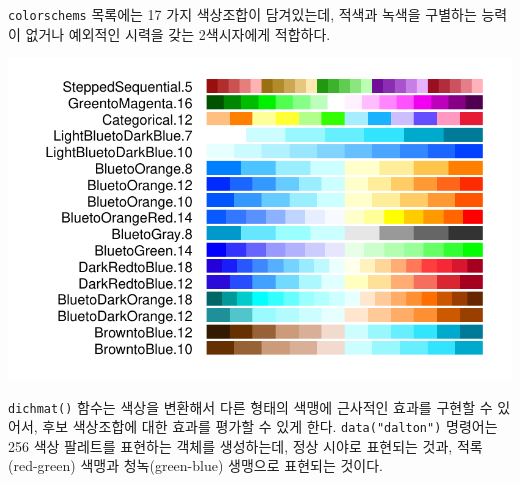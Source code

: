 \documentclass[
  letterpaper,
]{book}
\newenvironment{Shaded}{\begin{snugshade}}{\end{snugshade}}
\newcommand{\AttributeTok}[1]{\textcolor[rgb]{0.40,0.45,0.13}{#1}}
\newcommand{\ControlFlowTok}[1]{\textcolor[rgb]{0.00,0.23,0.31}{#1}}
\newcommand{\FunctionTok}[1]{\textcolor[rgb]{0.28,0.35,0.67}{#1}}
\newcommand{\NormalTok}[1]{\textcolor[rgb]{0.00,0.23,0.31}{#1}}
\newcommand{\OtherTok}[1]{\textcolor[rgb]{0.00,0.23,0.31}{#1}}
\newcommand{\SpecialCharTok}[1]{\textcolor[rgb]{0.37,0.37,0.37}{#1}}
\newcommand{\StringTok}[1]{\textcolor[rgb]{0.13,0.47,0.30}{#1}}
\begin{document}
\texttt{colorschems} 목록에는 17 가지 색상조합이 담겨있는데, 적색과
녹색을 구별하는 능력이 없거나 예외적인 시력을 갖는 2색시자에게 적합하다.

\includegraphics{colors_files/figure-pdf/dichromat-colorschemes-1.pdf}

\texttt{dichmat()} 함수는 색상을 변환해서 다른 형태의 색맹에 근사적인
효과를 구현할 수 있어서, 후보 색상조합에 대한 효과를 평가할 수 있게
한다. \texttt{data("dalton")} 명령어는 256 색상 팔레트를 표현하는 객체를
생성하는데, 정상 시야로 표현되는 것과, 적록(red-green) 색맹과
청녹(green-blue) 생맹으로 표현되는 것이다.\autocite{rogowitz1996ibm}

\begin{Shaded}
\end{Shaded}
\end{document}
